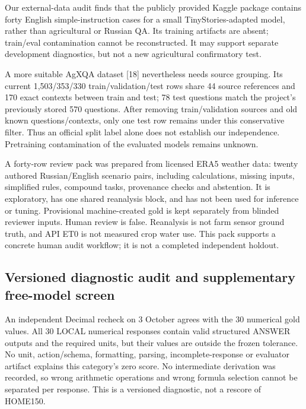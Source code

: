 \documentclass[10pt,a4paper,twocolumn]{article}
\begin{document}
Our external-data audit finds that the publicly provided Kaggle package contains forty English simple-instruction cases for a small TinyStories-adapted model, rather than agricultural or Russian QA. Its training artifacts are absent; train/eval contamination cannot be reconstructed. It may support separate development diagnostics, but not a new agricultural confirmatory test.

A more suitable AgXQA dataset [18] nevertheless needs source grouping. Its current 1,503/353/330 train/validation/test rows share 44 source references and 170 exact contexts between train and test; 78 test questions match the project's previously stored 570 questions. After removing train/validation sources and old known questions/contexts, only one test row remains under this conservative filter. Thus an official split label alone does not establish our independence. Pretraining contamination of the evaluated models remains unknown.

A forty-row review pack was prepared from licensed ERA5 weather data: twenty authored Russian/English scenario pairs, including calculations, missing inputs, simplified rules, compound tasks, provenance checks and abstention. It is exploratory, has one shared reanalysis block, and has not been used for inference or tuning. Provisional machine-created gold is kept separately from blinded reviewer inputs. Human review is false. Reanalysis is not farm sensor ground truth, and API ET0 is not measured crop water use. This pack supports a concrete human audit workflow; it is not a completed independent holdout.

\subsection{Versioned diagnostic audit and supplementary free-model screen}

An independent Decimal recheck on 3 October agrees with the 30 numerical gold values. All 30 LOCAL numerical responses contain valid structured ANSWER outputs and the required units, but their values are outside the frozen tolerance. No unit, action/schema, formatting, parsing, incomplete-response or evaluator artifact explains this category's zero score. No intermediate derivation was recorded, so wrong arithmetic operations and wrong formula selection cannot be separated per response. This is a versioned diagnostic, not a rescore of HOME150.
\end{document}
